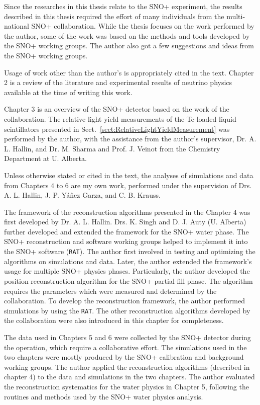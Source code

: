 Since the researches in this thesis relate to the SNO+ experiment, the results described in this thesis required the effort of many individuals from the multi-national SNO+ collaboration. While the thesis focuses on the work performed by the author, some of the work was based on the methods and tools developed by the SNO+ working groups. The author also got a few suggestions and ideas from the SNO+ working groups.

Usage of work other than the author's is appropriately cited in the text. Chapter 2 is a review of the literature and experimental results of neutrino physics available at the time of writing this work. 

Chapter 3 is an overview of the SNO+ detector based on the work of the collaboration. The relative light yield measurements of the Te-loaded liquid scintillators presented in Sect.~\ref{sect:RelativeLightYieldMeasurement} was performed by the author, with the assistance from the author's supervisor, Dr. A. L. Hallin, and Dr. M. Sharma and Prof. J. Veinot from the Chemistry Department at U. Alberta.

Unless otherwise stated or cited in the text, the analyses of simulations and data from Chapters 4 to 6 are my own work, performed under the supervision of Drs. A. L. Hallin, J. P. Y\'{a}\~{n}ez Garza, and C. B. Krauss. 

The framework of the reconstruction algorithms presented in the Chapter 4 was first developed by Dr. A. L. Hallin. Drs. K. Singh and D. J. Auty (U. Alberta) further developed and extended the framework for the SNO+ water phase. The SNO+ reconstruction and software working groups helped to implement it into the SNO+ software (\texttt{RAT}). The author first involved in testing and optimizing the algorithms on simulations and data. Later, the author extended the framework's usage for multiple SNO+ physics phases. Particularly, the author developed the position reconstruction algorithm for the SNO+ partial-fill phase. The algorithm requires the parameters which were measured and determined by the collaboration. To develop the reconstruction framework, the author performed simulations by using the \texttt{RAT}. The other reconstruction algorithms developed by the collaboration were also introduced in this chapter for completeness.
 
The data used in Chapters 5 and 6 were collected by the SNO+ detector during the operation, which require a collaborative effort. The simulations used in the two chapters were mostly produced by the SNO+ calibration and background working groups. The author applied the reconstruction algorithms (described in chapter 4) to the data and simulations in the two chapters. The author evaluated the reconstruction systematics for the water physics in Chapter 5, following the routines and methods used by the SNO+ water physics analysis.


